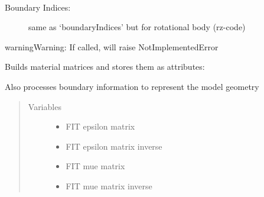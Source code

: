 \documentclass[letterpaper,10pt,english]{sphinxmanual}
\begin{document}
\begin{fulllineitems}

\begin{fulllineitems}
\label{\detokenize{FIT:FIT.FIT.boundaryIndicesBOR}}~\begin{description}
\item[{Boundary Indices:}] \leavevmode
same as ‘boundaryIndices’ but for rotational body (rz-code)

\end{description}

\begin{sphinxadmonition}{warning}{Warning:}
If called, will raise NotImplementedError
\end{sphinxadmonition}

\end{fulllineitems}


\begin{fulllineitems}
\label{\detokenize{FIT:FIT.FIT.buildMaterial}}
Builds material matrices and stores them as attributes:

Also processes boundary information to represent the model geometry
\begin{quote}\begin{description}
\item[{Variables}] \leavevmode\begin{itemize}
\item {} 
 \textendash{} FIT epsilon matrix

\item {} 
 \textendash{} FIT epsilon matrix inverse

\item {} 
 \textendash{} FIT mue matrix

\item {} 
 \textendash{} FIT mue matrix inverse

\end{itemize}

\end{description}\end{quote}


\end{fulllineitems}
\end{fulllineitems}
\end{document}
